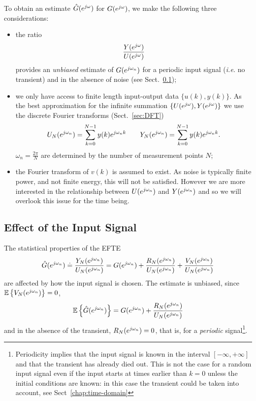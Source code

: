 To obtain an estimate $\hat{G}(\ejw)$ for $G(\ejw)$, we make the following three considerations:
\begin{itemize}
\item the ratio
  \begin{equation}
    \label{eq:EFTE}
    \frac{Y(\ejw)}{U(\ejw)}
  \end{equation}
  provides an \emph{unbiased} estimate of $G(\ejwn)$ for a periodic input signal (\textit{i.e.} no transient) and in the absence of noise (see Sect.~\ref{sec:ETFE-statistical-properties});
\item we only have access to finite length input-output data $\{u(k),y(k)\}$. As the best approximation for the infinite summation $\{U(\ejw), Y(\ejw)\}$ we use the discrete Fourier transforms (Sect.~\ref{sec:DFT})
  \begin{equation*}
    U_N(\ejwn) = \sum_{k=0}^{N-1} y(k)\ejwn[k] \hspace{2em} Y_N(\ejwn) = \sum_{k=0}^{N-1} y(k)\ejwn[k].
  \end{equation*}
  $\omega_n=\frac{2\pi}{N}$ are determined by the number of measurement points $N$;
\item the Fourier transform of $v(k)$ is assumed to exist. As noise is typically finite power, and not finite energy, this will not be satisfied. However we are more interested in the relationship between $U(\ejwn)$ and $Y(\ejwn)$ and so we will overlook this issue for the time being.
\end{itemize}

\subsection{Effect of the Input Signal}
\label{sec:ETFE-statistical-properties}

The statistical properties of the EFTE
\begin{equation}
  \label{eq:freq-domain-LTI-estimator}
  \hat{G}(\ejwn) \doteq \frac{Y_N(\ejwn)}{U_N(\ejwn)} = G(\ejwn) + \frac{R_N(\ejwn)}{U_N(\ejwn)} + \frac{V_N(\ejwn)}{U_N(\ejwn)}
\end{equation}
are affected by how the input signal is chosen. The estimate is unbiased, since $\EE{V_N(\ejwn)}=0$,
\begin{equation*}
  \EE{\hat{G}(\ejwn)} = G(\ejwn) + \frac{R_N(\ejwn)}{U_N(\ejwn)}
\end{equation*}
and in the absence of the transient, $R_N(\ejwn)=0$, that is, for a \emph{periodic} signal\footnote{Periodicity implies that the input signal is known in the interval $[-\infty,+\infty]$ and that the transient has already died out. This is not the case for a random input signal even if the input starts at times earlier than $k=0$ unless the initial conditions are known: in this case the transient could be taken into account, see Sect~\ref{chap:time-domain}}.

